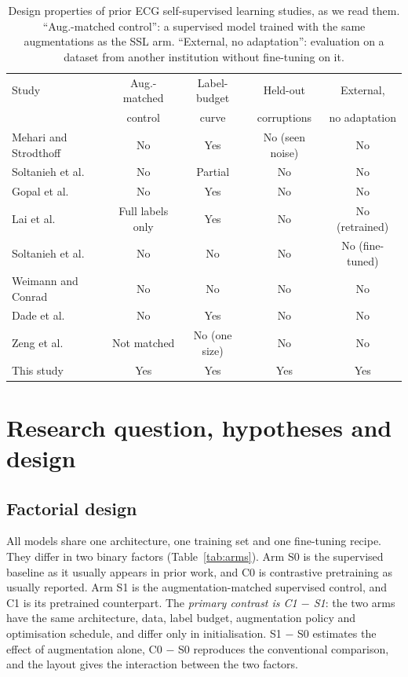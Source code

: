\documentclass[preprint,12pt]{elsarticle}
\begin{document}
\begin{table}[t]
\centering
\caption{Design properties of prior ECG self-supervised learning studies, as we read them. ``Aug.-matched control'': a supervised model trained with the same augmentations as the SSL arm. ``External, no adaptation'': evaluation on a dataset from another institution without fine-tuning on it.}
\label{tab:prior}
\scriptsize
\setlength{\tabcolsep}{3pt}
\begin{tabular}{lcccc}
\toprule
Study & Aug.-matched & Label-budget & Held-out & External, \\
      & control      & curve        & corruptions & no adaptation \\
\midrule
Mehari and Strodthoff \cite{mehari2022}   & No & Yes & No (seen noise) & No \\
Soltanieh et al.\ \cite{soltanieh2022aug} & No & Partial & No & No \\
Gopal et al.\ \cite{gopal2021}            & No & Yes & No & No \\
Lai et al.\ \cite{lai2023}                & Full labels only & Yes & No & No (retrained) \\
Soltanieh et al.\ \cite{soltanieh2024ood} & No & No & No & No (fine-tuned) \\
Weimann and Conrad \cite{weimann2025}     & No & No & No & No \\
Dade et al.\ \cite{dade2026}              & No & Yes & No & No \\
Zeng et al.\ \cite{zeng2026}              & Not matched & No (one size) & No & No \\
\midrule
This study                                & Yes & Yes & Yes & Yes \\
\bottomrule
\end{tabular}
\end{table}

\section{Research question, hypotheses and design}
\label{sec:design}

\subsection{Factorial design}

All models share one architecture, one training set and one fine-tuning recipe. They differ in two binary factors (Table~\ref{tab:arms}). Arm S0 is the supervised baseline as it usually appears in prior work, and C0 is contrastive pretraining as usually reported. Arm S1 is the augmentation-matched supervised control, and C1 is its pretrained counterpart. The \emph{primary contrast is C1 $-$ S1}: the two arms have the same architecture, data, label budget, augmentation policy and optimisation schedule, and differ only in initialisation. S1 $-$ S0 estimates the effect of augmentation alone, C0 $-$ S0 reproduces the conventional comparison, and the layout gives the interaction between the two factors.
\end{document}
